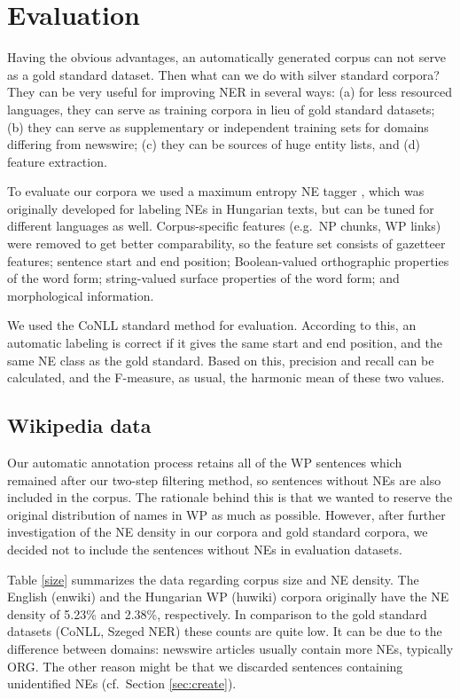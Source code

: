 \documentclass[11pt]{article}
\begin{document}
\section{Evaluation}
\label{sec:eval}

Having the obvious advantages, an automatically generated corpus can not serve as a gold standard dataset. Then what can we do with silver standard corpora? They can be very useful for
improving NER in several ways: (a) for less resourced languages, they can
serve as training corpora in lieu of gold standard datasets; (b) they can
serve as supplementary or independent training sets for domains differing
from newswire; (c) they can be sources of huge entity lists, and (d) feature
extraction.

To evaluate our corpora we used a maximum entropy NE tagger \cite{Varga:07},
which was originally developed for labeling NEs in Hungarian texts, but can
be tuned for different languages as well. Corpus-specific features (e.g.~NP
chunks, WP links) were removed to get better comparability, so the feature set
consists of gazetteer features; sentence start and end position;
Boolean-valued orthographic properties of the word form; string-valued surface
properties of the word form; and morphological information.

We used the CoNLL standard method for evaluation. According to this, an automatic labeling is correct if it gives the same start and end position, and the same NE class as the gold standard. Based on this, precision and recall can be calculated, and the F-measure, as usual, the harmonic mean of these two values.  

\subsection{Wikipedia data}

Our automatic annotation process retains all of the WP sentences which
remained after our two-step filtering method, so sentences without NEs are
also included in the corpus. The rationale behind this is that we wanted to
reserve the original distribution of names in WP as much as possible. However,
after further investigation of the NE density in our corpora and gold standard
corpora, we decided not to include the sentences without NEs in evaluation
datasets.

Table \ref{size} summarizes the data regarding corpus size and NE density. The
English (enwiki) and the Hungarian WP (huwiki) corpora originally have the NE
density of 5.23\% and 2.38\%, respectively. In comparison to the gold standard
datasets (CoNLL, Szeged NER) these counts are quite low. It can be due to the
difference between domains: newswire articles usually contain more NEs,
typically ORG. The other reason might be that we discarded sentences
containing unidentified NEs (cf.~Section \ref{sec:create}).
\end{document}
